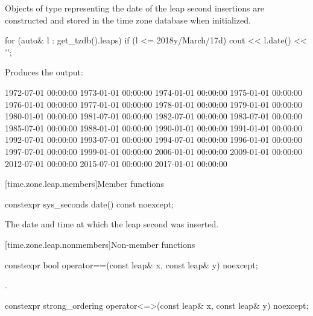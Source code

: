 \pnum
Objects of type  representing
the date of the leap second insertions
are constructed and stored in the time zone database when initialized.

\pnum
\begin{example}
\begin{codeblock}
for (auto& l : get_tzdb().leaps)
  if (l <= 2018y/March/17d)
    cout << l.date() << '\n';
\end{codeblock}

Produces the output:

\begin{outputblock}
1972-07-01 00:00:00
1973-01-01 00:00:00
1974-01-01 00:00:00
1975-01-01 00:00:00
1976-01-01 00:00:00
1977-01-01 00:00:00
1978-01-01 00:00:00
1979-01-01 00:00:00
1980-01-01 00:00:00
1981-07-01 00:00:00
1982-07-01 00:00:00
1983-07-01 00:00:00
1985-07-01 00:00:00
1988-01-01 00:00:00
1990-01-01 00:00:00
1991-01-01 00:00:00
1992-07-01 00:00:00
1993-07-01 00:00:00
1994-07-01 00:00:00
1996-01-01 00:00:00
1997-07-01 00:00:00
1999-01-01 00:00:00
2006-01-01 00:00:00
2009-01-01 00:00:00
2012-07-01 00:00:00
2015-07-01 00:00:00
2017-01-01 00:00:00
\end{outputblock}
\end{example}

[time.zone.leap.members]{Member functions}

%
\begin{itemdecl}
constexpr sys_seconds date() const noexcept;
\end{itemdecl}

\begin{itemdescr}
\pnum
\returns
The date and time at which the leap second was inserted.
\end{itemdescr}

[time.zone.leap.nonmembers]{Non-member functions}

%
\begin{itemdecl}
constexpr bool operator==(const leap& x, const leap& y) noexcept;
\end{itemdecl}

\begin{itemdescr}
\pnum
\returns
{}.
\end{itemdescr}

%
\begin{itemdecl}
constexpr strong_ordering operator<=>(const leap& x, const leap& y) noexcept;
\end{itemdecl}

